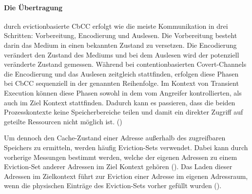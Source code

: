 \paragraph{Die Übertragung}
durch evictionbasierte \ac{CbCC} erfolgt wie die meiste
Kommunikation in drei Schritten: Vorbereitung, Encodierung
und Auslesen. Die Vorbereitung besteht darin
das Medium in einen bekannten Zustand zu versetzen.
Die Encodierung verändert den Zustand des Mediums und bei dem
Auslesen wird der potenziell veränderte Zustand gemessen.
Während bei contentionbasierten Covert-Channels die Encodierung
und das Auslesen zeitgleich stattfinden, erfolgen diese Phasen
bei \ac{CbCC} sequenziell in der genannten Reihenfolge.
Im Kontext von Transient Execution können diese Phasen
sowohl in dem vom Angreifer kontrollierten, als auch im Ziel
Kontext stattfinden. Dadurch kann es passieren, dass die beiden
Prozesskontexte keine Speicherbereiche teilen und damit ein
direkter Zugriff auf geteilte Ressourcen nicht
möglich ist. (\cite[15]{xiong_survey_2022})

Um dennoch den Cache-Zustand einer Adresse
außerhalb des zugreifbaren Speichers zu ermitteln, werden
häufig Eviction-Sets verwendet. Dabei kann durch vorherige
Messungen bestimmt werden, welche der eigenen Adressen zu
einem Eviction-Set anderer Adressen im Ziel Kontext gehören
(\cite{vila_theory_2019}). Das Laden dieser Adressen im
Zielkontext führt zur Eviction einer Adresse im eigenen
Adressraum, wenn die physischen Einträge des
Eviction-Sets vorher gefüllt wurden
(\cite[607]{liu_last-level_2015}).

